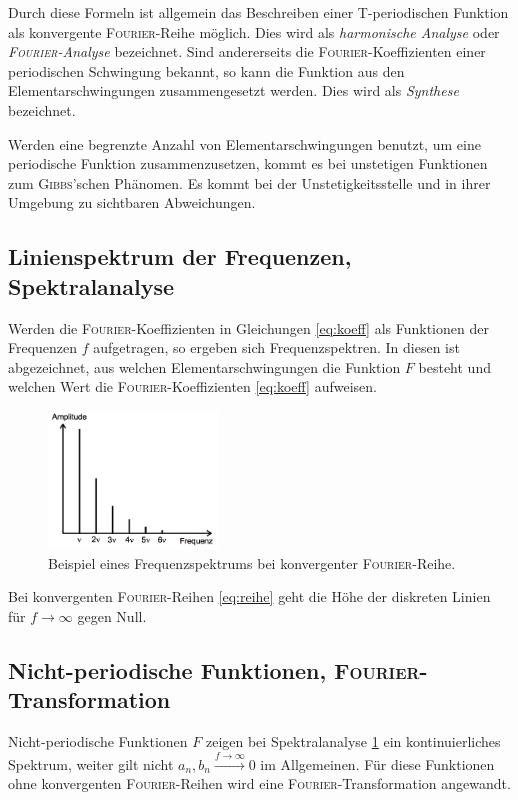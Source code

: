Durch diese Formeln ist allgemein das Beschreiben einer T-periodischen Funktion als konvergente \textsc{Fourier}-Reihe möglich.
Dies wird als \textit{harmonische Analyse} oder \textit{\textsc{Fourier}-Analyse} bezeichnet.
Sind andererseits die \textsc{Fourier}-Koeffizienten einer periodischen Schwingung bekannt, so kann die Funktion aus den Elementarschwingungen zusammengesetzt werden.
Dies wird als \textit{Synthese} bezeichnet.

Werden eine begrenzte Anzahl von Elementarschwingungen benutzt, um eine periodische Funktion zusammenzusetzen, kommt es bei unstetigen Funktionen zum \textsc{Gibbs}'schen Phänomen.
Es kommt bei der Unstetigkeitsstelle und in ihrer Umgebung zu sichtbaren Abweichungen.

\subsection{Linienspektrum der Frequenzen, Spektralanalyse}
\label{sec:theorie2}
Werden die \textsc{Fourier}-Koeffizienten in Gleichungen \eqref{eq:koeff} als Funktionen der Frequenzen $f$ aufgetragen, so ergeben sich Frequenzspektren. 
In diesen ist abgezeichnet, aus welchen Elementarschwingungen die Funktion $F$ besteht und welchen Wert die \textsc{Fourier}-Koeffizienten \eqref{eq:koeff} aufweisen.
\begin{figure}
	\centering
	\includegraphics[width=0.4\textwidth]{Bilder/Linienspektrum.png}
	\caption{Beispiel eines Frequenzspektrums bei konvergenter \textsc{Fourier}-Reihe. \cite{V351}}
	\label{fig:analyse}
\end{figure}
Bei konvergenten \textsc{Fourier}-Reihen \eqref{eq:reihe} geht die Höhe der diskreten Linien für $f\xrightarrow{}\infty$ gegen Null.

\subsection{Nicht-periodische Funktionen, \textsc{Fourier}-Transformation}
\label{sec:theorie3}
Nicht-periodische Funktionen $F$ zeigen bei Spektralanalyse \ref{fig:analyse} ein kontinuierliches Spektrum, weiter gilt nicht $a_n,b_n\xrightarrow{f\to\infty}0$ im Allgemeinen.
Für diese Funktionen ohne konvergenten \textsc{Fourier}-Reihen wird eine \textsc{Fourier}-Transformation angewandt.


